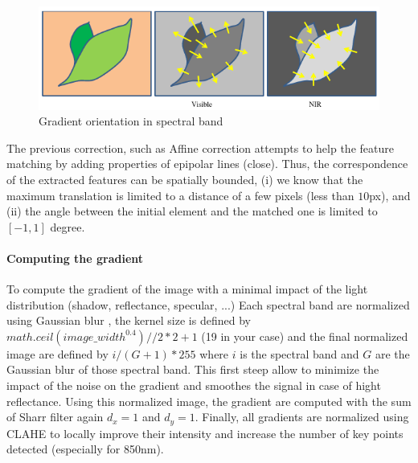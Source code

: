 \documentclass[]{elsarticle}
\begin{document}
	\begin{figure}[!htb]
		\centering
		\includegraphics[width=\linewidth]{../figures/contrast-inversion.png}
		\caption{Gradient orientation in spectral band \cite{rabatel:hal-01684135}}
		\label{fig:vegetable-gradient}
	\end{figure}
	
	\par The previous correction, such as Affine correction attempts to help the feature matching by adding properties of epipolar lines (close).
	Thus, the correspondence of the extracted features can be spatially bounded,
	(i) we know that the maximum translation is limited to a distance of a few pixels (less than $10$px),
	and (ii) the angle between the initial element and the matched one is limited to $[-1,1]$ degree.
	
	\paragraph{Computing the gradient} To compute the gradient of the image with a minimal impact of the light distribution (shadow, reflectance, specular, ...)
	Each spectral band are normalized using Gaussian blur \cite{sage0303}, the kernel size is defined by $math.ceil(image\_width^{0.4}) // 2 * 2 +1$ (19 in your case)
	and the final normalized image are defined by $i/(G+1)*255$ where $i$ is the spectral band and $G$ are the Gaussian blur of those spectral band.
	This first steep allow to minimize the impact of the noise on the gradient and smoothes the signal in case of hight reflectance.
	Using this normalized image, the gradient are computed with the sum of Sharr filter \cite{Seitz} again $d_x=1$ and $d_y=1$.
	Finally, all gradients are normalized using CLAHE \cite{zuiderveld1994contrast} to locally improve their intensity and increase the number of key points detected (especially for 850nm).
	
\end{document}
